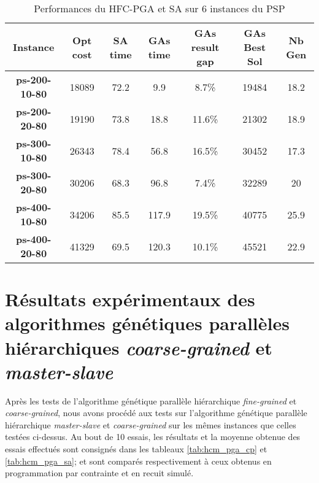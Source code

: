 	\begin{table}[h]
		\centering
		\begin{tabular}{|c|c|c|c|c|c|c|}
			\hline
			\textbf{Instance} & \textbf{Opt cost} & \textbf{SA time} & \textbf{GAs time} & \textbf{GAs result gap} & \textbf{GAs Best Sol} & \textbf{Nb Gen}\\
			\hline
			\textbf{ps-200-10-80} & 18089 & 72.2 & 9.9 & 8.7\% & 19484 & 18.2 \\
			\textbf{ps-200-20-80} & 19190 & 73.8 & 18.8 & 11.6\% & 21302 & 18.9 \\
			\textbf{ps-300-10-80} & 26343 & 78.4 & 56.8 & 16.5\% & 30452 & 17.3 \\
			\textbf{ps-300-20-80} & 30206 & 68.3 & 96.8 & 7.4\% & 32289 & 20 \\
			\textbf{ps-400-10-80} & 34206 & 85.5 & 117.9 & 19.5\% & 40775 & 25.9 \\
			\textbf{ps-400-20-80} & 41329 & 69.5 & 120.3 & 10.1\% & 45521 & 22.9 \\
			\hline
		\end{tabular}	
		\caption{Performances du HFC-PGA et SA sur 6 instances du PSP}
		\label{tab:hfc_pga_sa}	
	\end{table}			
		
		\section{Résultats expérimentaux des algorithmes génétiques parallèles hiérarchiques \emph{coarse-grained} et \emph{master-slave}}
		
		Après les tests de l'algorithme génétique parallèle hiérarchique \emph{fine-grained} et \emph{coarse-grained}, nous avons procédé aux tests sur l'algorithme génétique parallèle hiérarchique \emph{master-slave} et \emph{coarse-grained} sur les mêmes instances que celles testées ci-dessus. Au bout de 10 essais, les résultats et la moyenne obtenue des essais effectués sont consignés dans les tableaux \ref{tab:hcm_pga_cp}  et \ref{tab:hcm_pga_sa}; et sont comparés respectivement à ceux obtenus en programmation par contrainte et en recuit simulé.
		
